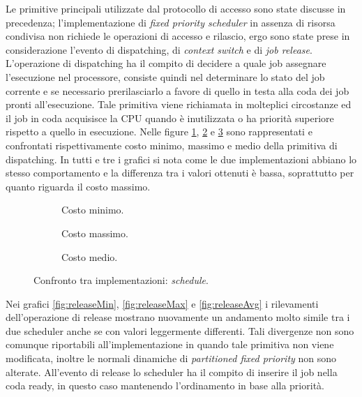 {\noindent Le primitive principali utilizzate dal protocollo di accesso sono state discusse in precedenza; l'implementazione di \textit{fixed priority scheduler} in assenza di risorsa condivisa non richiede le operazioni di accesso e rilascio, ergo sono state prese in considerazione l'evento di dispatching, di \textit{context switch} e di \textit{job release}.\\

\noindent L'operazione di dispatching ha il compito di decidere a quale job assegnare l'esecuzione nel processore, consiste quindi nel determinare lo stato del job corrente e se necessario prerilasciarlo a favore di quello in testa alla coda dei job pronti all'esecuzione. Tale primitiva viene richiamata in molteplici circostanze ed il job in coda acquisisce la CPU quando è inutilizzata o ha priorità superiore rispetto a quello in esecuzione. Nelle figure \ref{fig:schedMin}, \ref{fig:schedMax} e \ref{fig:schedAvg} sono rappresentati e confrontati rispettivamente costo minimo, massimo e medio della primitiva di dispatching. In tutti e tre i grafici si nota come le due implementazioni abbiano lo stesso comportamento e la differenza tra i valori ottenuti è bassa, soprattutto per quanto riguarda il costo massimo.\\

  \begin{figure}[htb]
    \centering
      \begin{subfigure}[b]{0.49\textwidth}
        \centering
        \resizebox{\linewidth}{!}\graficoSchedMIN  
        \caption{Costo minimo.}
        \label{fig:schedMin}
      \end{subfigure}
      \begin{subfigure}[b]{0.49\textwidth}
        \centering
        \resizebox{\linewidth}{!}\graficoSchedMAX
        \caption{Costo massimo.}
        \label{fig:schedMax}
      \end{subfigure}
      \begin{subfigure}[b]{0.49\textwidth}
        \centering
        \resizebox{\linewidth}{!}\graficoSchedAVG
        \caption{Costo medio.}
        \label{fig:schedAvg}
      \end{subfigure}

    \caption{Confronto tra implementazioni: \textit{schedule}.}
    \label{fig:sched}
  \end{figure}

\noindent Nei grafici \ref{fig:releaseMin}, \ref{fig:releaseMax} e \ref{fig:releaseAvg} i rilevamenti dell'operazione di release mostrano nuovamente un andamento molto simile tra i due scheduler anche se con valori leggermente differenti. Tali divergenze non sono comunque riportabili all'implementazione in quando tale primitiva non viene modificata, inoltre le normali dinamiche di \textit{partitioned fixed priority} non sono alterate. All'evento di release lo scheduler ha il compito di inserire il job nella coda ready, in questo caso mantenendo l'ordinamento in base alla priorità.\\

}
